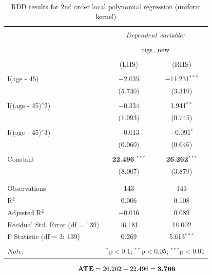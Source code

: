 \documentclass[a4paper]{article}
\begin{document}
\begin{table}[!htbp] \centering 
	\caption{RDD results for 2nd order local polynomial regression (uniform kernel)} 
	\label{} 
	\begin{tabular}{@{\extracolsep{5pt}}lcc} 
		\\[-1.8ex]\hline 
		\hline \\[-1.8ex] 
		& \multicolumn{2}{c}{\textit{Dependent variable:}} \\ 
		\cline{2-3} 
		\\[-1.8ex] & \multicolumn{2}{c}{cigs\_new} \\ 
		\\[-1.8ex] & (LHS) & (RHS)\\ 
		\hline \\[-1.8ex] 
		I(age - 45) & $-$2.035 & $-$11.231$^{***}$ \\ 
		& (5.740) & (3.319) \\ 
		& & \\ 
		I((age - 45)$\hat{\mkern6mu}$2) & $-$0.334 & 1.941$^{**}$ \\ 
		& (1.093) & (0.745) \\ 
		& & \\ 
		I((age - 45)$\hat{\mkern6mu}$3) & $-$0.013 & $-$0.091$^{*}$ \\ 
		& (0.060) & (0.046) \\ 
		& & \\ 
		Constant & \textbf{22.496} $^{***}$ & \textbf{26.262}$^{***}$ \\ 
		& (8.007) & (3.879) \\ 
		& & \\ 
		\hline \\[-1.8ex] 
		Observations & 143 & 143 \\ 
		R$^{2}$ & 0.006 & 0.108 \\ 
		Adjusted R$^{2}$ & $-$0.016 & 0.089 \\ 
		Residual Std. Error (df = 139) & 16.181 & 16.002 \\ 
		F Statistic (df = 3; 139) & 0.269 & 5.613$^{***}$ \\ 
		\hline 
		\hline \\[-1.8ex] 
		\textit{Note:}  & \multicolumn{2}{r}{$^{*}$p$<$0.1; $^{**}$p$<$0.05; $^{***}$p$<$0.01} \\ 
	\end{tabular} 
\end{table} 


\begin{equation}
\text{\textbf{ATE}} = 26.262 - 22.496 = \textbf{3.766}
\end{equation}
\end{document}
